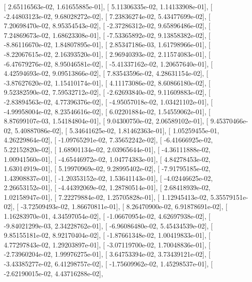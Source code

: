 \documentclass{article}
\begin{document}
       [  2.65116563e-02,   1.61655885e-01],
       [  5.11306335e-02,   1.14133908e-01],
       [ -2.44803123e-02,   9.68028272e-02],
       [  7.23836274e-02,   5.43477699e-02],
       [  7.20698470e-02,   8.95354543e-02],
       [ -2.37286312e-02,   9.65896486e-02],
       [  7.24869673e-02,   1.68623308e-01],
       [ -7.53365892e-02,   9.13858382e-02],
       [ -8.86116670e-02,   1.84807895e-01],
       [  2.85347186e-03,   1.61798966e-01],
       [ -8.22067615e-02,   2.16393520e-01],
       [  2.96940393e-02,   2.11574083e-01],
       [ -6.47679276e-02,   8.95046581e-02],
       [ -5.41337162e-02,   1.20657640e-01],
       [  4.42594693e-02,   9.09513866e-02],
       [  7.83543596e-02,   4.28631154e-02],
       [ -3.87627620e-02,   1.15410174e-01],
       [  4.11173086e-02,   8.60866180e-02],
       [  9.52382590e-02,   7.59532712e-02],
       [ -2.62693840e-02,   9.11609883e-02],
       [ -2.83894563e-02,   4.77396376e-02],
       [ -4.95057018e-02,   1.03421102e-01],
       [ -4.99958004e-02,   8.23546616e-02],
       [  6.02201884e-02,   1.54559062e-01],
       [  8.87699107e-03,   1.54184804e-01],
       [  9.04300750e-02,   2.06589102e-01],
       [  9.45370466e-02,   5.40887086e-02],
       [  5.34641625e-02,   1.81462363e-01],
       [  1.05259455e-01,   4.26229864e-02],
       [ -1.09765291e-02,   7.35652242e-02],
       [ -6.41666925e-02,   5.22152820e-02],
       [  1.68901134e-02,   2.03965644e-01],
       [ -4.36111888e-02,   1.00941560e-01],
       [ -4.65446972e-02,   1.04774383e-01],
       [  4.84278453e-02,   1.63014919e-01],
       [  5.19970969e-02,   9.28995402e-02],
       [ -7.91795185e-02,   1.43908837e-01],
       [ -1.20353152e-02,   1.53641143e-01],
       [ -4.02446625e-02,   2.26653152e-01],
       [ -4.44392069e-02,   1.28780514e-01],
       [  2.68418939e-02,   1.02158947e-01],
       [  7.22279884e-02,   1.25705828e-01],
       [  1.12945413e-02,   5.35579151e-02],
       [ -3.72509493e-02,   1.86670811e-01],
       [  8.26470900e-02,   6.91878691e-02],
       [  1.16283970e-01,   4.34597054e-02],
       [ -1.06670954e-02,   4.62697938e-02],
       [ -9.84021299e-03,   2.34228762e-01],
       [ -6.96086480e-02,   5.45434539e-02],
       [  9.85155181e-02,   8.92170404e-02],
       [ -1.87661348e-02,   1.00419833e-01],
       [  4.77297843e-02,   1.29203897e-01],
       [ -3.07119700e-02,   1.70048836e-01],
       [ -2.73960204e-02,   1.99976275e-01],
       [  3.64753394e-02,   3.73439121e-02],
       [ -3.43385277e-02,   6.41298757e-02],
       [ -1.75609962e-02,   1.45298537e-01],
       [ -2.62190015e-02,   4.43716288e-02],
\end{document}
